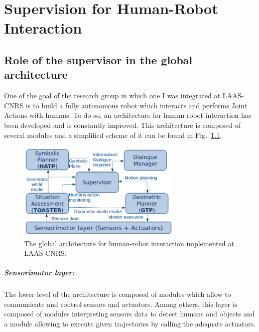 \documentclass[english,a4paper,11pt,twoside]{StyleThese}
\begin{document}
\setcounter{chapter}{1} %
\dominitoc
\faketableofcontents
\fi

\chapter{Supervision for Human-Robot Interaction}
\minitoc

\label{ch:Sup}

\section{Role of the supervisor in the global architecture}

One of the goal of the research group in which one I was integrated at LAAS-CNRS is to build a fully autonomous robot which interacts and performs Joint Actions with humans. To do so, an architecture for human-robot interaction has been developed and is constantly improved. This architecture is composed of several modules and a simplified scheme of it can be found in Fig.~\ref{fig:GlobalArchi}.

\begin{figure}[!h]
	\centering
    \includegraphics[width=0.7\textwidth]{figs/Chapter2/archiGlobal.png}
    \caption{The global architecture for human-robot interaction implemented at LAAS-CNRS.}
    \label{fig:GlobalArchi}
\end{figure}

\paragraph{Sensorimotor layer:}
The lower level of the architecture is composed of modules which allow to communicate and control sensors and actuators. Among others, this layer is composed of modules interpreting sensors data to detect humans and objects and a module allowing to execute given trajectories by calling the adequate actuators.
\end{document}
